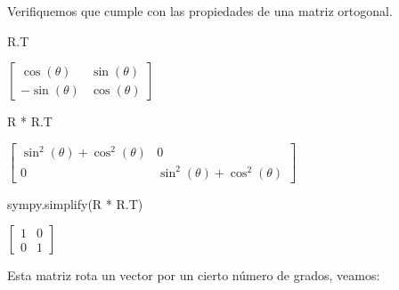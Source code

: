\documentclass[
  letterpaper,
  DIV=11,
  numbers=noendperiod]{scrreprt}
\newenvironment{Shaded}{\begin{snugshade}}{\end{snugshade}}
\newcommand{\NormalTok}[1]{\textcolor[rgb]{0.00,0.23,0.31}{#1}}
\newcommand{\OperatorTok}[1]{\textcolor[rgb]{0.37,0.37,0.37}{#1}}
\begin{document}
Verifiquemos que cumple con las propiedades de una matriz ortogonal.

\begin{Shaded}
\begin{Highlighting}[]
\NormalTok{R.T}
\end{Highlighting}
\end{Shaded}

$\displaystyle \left[\begin{matrix}\cos{\left(\theta \right)} & \sin{\left(\theta \right)}\\- \sin{\left(\theta \right)} & \cos{\left(\theta \right)}\end{matrix}\right]$

\begin{Shaded}
\begin{Highlighting}[]
\NormalTok{R }\OperatorTok{*}\NormalTok{ R.T}
\end{Highlighting}
\end{Shaded}

$\displaystyle \left[\begin{matrix}\sin^{2}{\left(\theta \right)} + \cos^{2}{\left(\theta \right)} & 0\\0 & \sin^{2}{\left(\theta \right)} + \cos^{2}{\left(\theta \right)}\end{matrix}\right]$

\begin{Shaded}
\begin{Highlighting}[]
\NormalTok{sympy.simplify(R }\OperatorTok{*}\NormalTok{ R.T)}
\end{Highlighting}
\end{Shaded}

$\displaystyle \left[\begin{matrix}1 & 0\\0 & 1\end{matrix}\right]$

Esta matriz rota un vector por un cierto número de grados, veamos:
\end{document}
